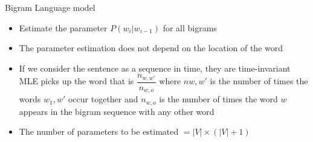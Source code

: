 \begin{frame}{Bigram Language model}
	\begin{itemize}
		\item Estimate the parameter $P(w_i|w_{i-1})$ for all bigrams
		\item The parameter estimation does not depend on the location of the word
		\item If we consider the sentence as a sequence in time, they are time-invariant
		MLE picks up the word that is $\dfrac{n_{w,w'}}{n_{w,o}}$ where $n{w,w'}$ is the number of times the words $w_1,w'$ occur together and $n_{w,o}$ is the number of times the word $w$ appears in the bigram sequence with any other word
		\item The number of parameters to be estimated  $=\left|V\right|\times (\left|V\right| + 1)$
	\end{itemize}
\end{frame}


%
%
%
%
